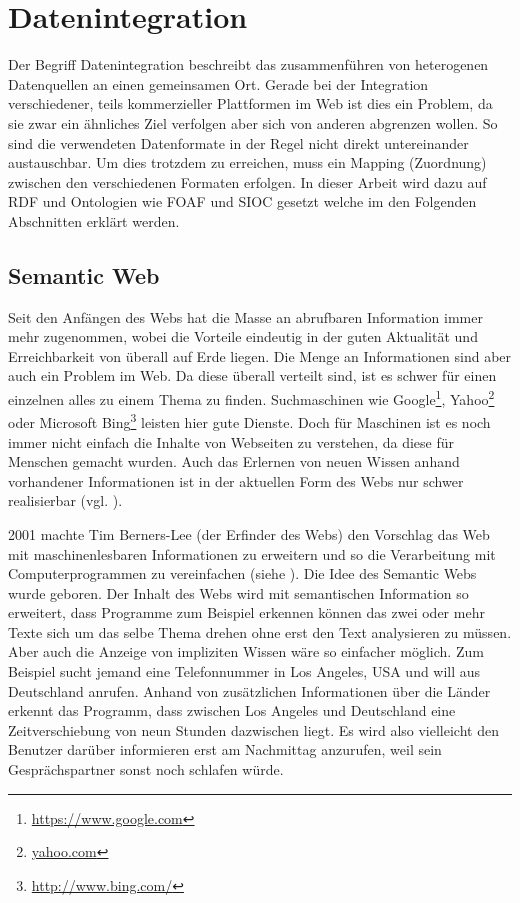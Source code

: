 

\section{Datenintegration} %
\label{sec:datenintegration}

Der Begriff Datenintegration beschreibt das zusammenführen von heterogenen Datenquellen an einen gemeinsamen Ort. Gerade bei der Integration verschiedener, teils kommerzieller Plattformen im Web ist dies ein Problem, da sie zwar ein ähnliches Ziel verfolgen aber sich von anderen abgrenzen wollen. So sind die verwendeten Datenformate in der Regel nicht direkt untereinander austauschbar. Um dies trotzdem zu erreichen, muss ein Mapping (Zuordnung) zwischen den verschiedenen Formaten erfolgen. In dieser Arbeit wird dazu auf RDF und Ontologien wie FOAF und SIOC gesetzt welche im den Folgenden Abschnitten erklärt werden.

\subsection{Semantic Web} %
\label{sub:semantic_web}

Seit den Anfängen des Webs hat die Masse an abrufbaren Information immer mehr zugenommen, wobei die Vorteile eindeutig in der guten Aktualität und Erreichbarkeit von überall auf Erde liegen. Die Menge an Informationen sind aber auch ein Problem im Web. Da diese überall verteilt sind, ist es schwer für einen einzelnen alles zu einem Thema zu finden. Suchmaschinen wie Google\footnote{\url{https://www.google.com}}, Yahoo\footnote{\url{yahoo.com}} oder Microsoft Bing\footnote{\url{http://www.bing.com/}} leisten hier gute Dienste. Doch für Maschinen ist es noch immer nicht einfach die Inhalte von Webseiten zu verstehen, da diese für Menschen gemacht wurden. Auch das Erlernen von neuen Wissen anhand vorhandener Informationen ist in der aktuellen Form des Webs nur schwer realisierbar (vgl. \cite{Hitzler2008a}). 

2001 machte Tim Berners-Lee (der Erfinder des Webs) den Vorschlag das Web mit maschinenlesbaren Informationen zu erweitern und so die Verarbeitung mit Computerprogrammen zu vereinfachen (siehe \cite{Berners-Lee2001}). Die Idee des Semantic Webs wurde geboren. Der Inhalt des Webs wird mit semantischen Information so erweitert, dass Programme zum Beispiel erkennen können das zwei oder mehr Texte sich um das selbe Thema drehen ohne erst den Text analysieren zu müssen. Aber auch die Anzeige von impliziten Wissen wäre so einfacher möglich. Zum Beispiel sucht jemand eine Telefonnummer in Los Angeles, USA und will aus Deutschland anrufen. Anhand von zusätzlichen Informationen über die Länder erkennt das Programm, dass zwischen Los Angeles und Deutschland eine Zeitverschiebung von neun Stunden dazwischen liegt. Es wird also vielleicht den Benutzer darüber informieren erst am Nachmittag anzurufen, weil sein Gesprächspartner sonst noch schlafen würde.

